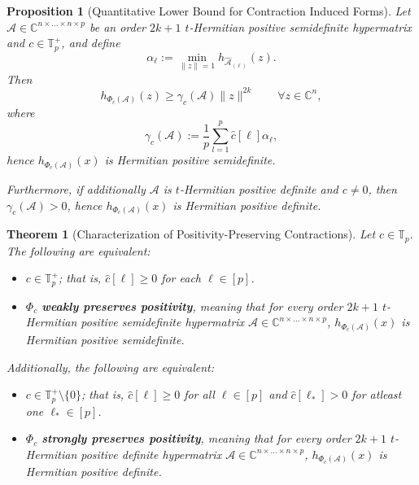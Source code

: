 \documentclass[10pt,a4paper]{amsart}
\newtheorem{proposition}{Proposition}
\newtheorem{theorem}{Theorem}
\begin{document}
\begin{proposition}[Quantitative Lower Bound for Contraction Induced Forms]\label{Quantitative Lower Bound for Contraction Induced Forms}
    Let $\mathcal{A}\in \mathbb{C}^{n\times\dots\times n\times p}$ be an order $2k+1$ $t$-Hermitian positive semidefinite hypermatrix and $c\in \mathbb{T}_p^+$, and define 
    \[\alpha_{\ell} := \min\limits_{\|z\|=1}h_{\widehat{\mathcal{A}}_{(\ell)}}(z).\]
    Then \[h_{\Phi_c(\mathcal{A})}(z) \geq \gamma_c(\mathcal{A})\|z\|^{2k}\qquad \forall z\in \mathbb{C}^n,\]
    where 
    \[\gamma_c(\mathcal{A}) := \frac{1}{p}\sum\limits_{l=1}^p\widehat{c}[\ell]\alpha_{\ell},\]
    hence $h_{\Phi_c(\mathcal{A})}(x)$ is Hermitian positive semidefinite. 
    
    Furthermore, if additionally $\mathcal{A}$ is $t$-Hermitian positive definite and $c\neq 0$, then $\gamma_c(\mathcal{A}) > 0$, hence $h_{\Phi_c(\mathcal{A})}(x)$ is Hermitian positive definite. 
\end{proposition}

\begin{theorem}[Characterization of Positivity-Preserving Contractions]
    Let $c\in \mathbb{T}_p$. The following are equivalent:
    \begin{itemize}
        \item[(i)] $c\in \mathbb{T}_p^+$; that is, $\widehat{c}[\ell]\geq 0$ for each $\ell\in [p]$. 
        \item[(ii)] $\Phi_c$ \textbf{weakly preserves positivity}, meaning that for every order $2k+1$ $t$-Hermitian positive semidefinite hypermatrix $\mathcal{A}\in \mathbb{C}^{n\times\dots\times n\times p}$, $h_{\Phi_c(\mathcal{A})}(x)$ is Hermitian positive semidefinite. 
    \end{itemize}
    Additionally, the following are equivalent:
    \begin{itemize}
        \item[(a)] $c\in \mathbb{T}_p^+\setminus \{0\}$; that is, $\widehat{c}[\ell]\geq 0$ for all $\ell\in [p]$ and $\widehat{c}[\ell_*] > 0$ for atleast one $\ell_*\in [p]$. 
        \item[(b)] $\Phi_c$ \textbf{strongly preserves positivity}, meaning that for every order $2k+1$ $t$-Hermitian positive definite hypermatrix $\mathcal{A}\in \mathbb{C}^{n\times\dots\times n\times p}$, $h_{\Phi_c(\mathcal{A})}(x)$ is Hermitian positive definite. 
    \end{itemize}
\end{theorem}
\end{document}
